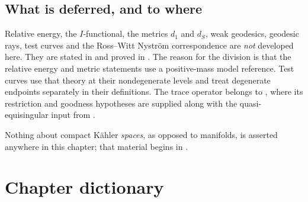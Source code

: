 \subsection{What is deferred, and to where}
\label{sec:ch51-deferred}

Relative energy, the $I$-functional, the metrics $d_1$ and $d_S$,
weak geodesics, geodesic rays, test curves and the Ross--Witt Nystr\"om
correspondence are \emph{not} developed here.  They are stated in
and proved in .  The reason for the division
is that the relative energy and metric statements use a positive-mass
model reference.  Test curves use that theory at their nondegenerate
levels and treat degenerate endpoints separately in their definitions.
The trace operator belongs to , where its
restriction and goodness hypotheses are supplied along with the
quasi-equisingular input from .

Nothing about compact K\"ahler \emph{spaces}, as opposed to manifolds, is
asserted anywhere in this chapter; that material begins in
.

\section{Chapter dictionary}
\label{sec:ch51-dictionary}

